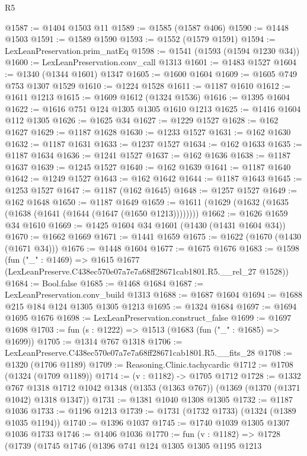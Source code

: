 \begin{lexlean}{R5}
\begin{coremodule}
@1587 := @1404 @1503 @11
@1589 := @1585 (@1587 @406)
@1590 := @1448 @1503
@1591 := @1589 @1590
@1593 := @1552 (@1579 @1591)
@1594 := LexLeanPreservation.prim_natEq
@1598 := @1541 (@1593 (@1594 @1230 @34))
@1600 := LexLeanPreservation.conv_call @1313
@1601 := @1483 @1527
@1604 := @1340 (@1344 @1601) @1347
@1605 := @1600 @1604
@1609 := @1605 @749 @753 @1307 @1529
@1610 := @1224 @1528
@1611 := @1187 @1610
@1612 := @1611 @1213
@1615 := @1609 @1612 (@1324 @1536)
@1616 := @1395 @1604
@1622 := @1616 @751 @124 @1305 @1305 @1610 @1213
@1625 := @1416 @1604 @112 @1305
@1626 := @1625 @34
@1627 := @1229 @1527
@1628 := @162 @1627
@1629 := @1187 @1628
@1630 := @1233 @1527
@1631 := @162 @1630
@1632 := @1187 @1631
@1633 := @1237 @1527
@1634 := @162 @1633
@1635 := @1187 @1634
@1636 := @1241 @1527
@1637 := @162 @1636
@1638 := @1187 @1637
@1639 := @1245 @1527
@1640 := @162 @1639
@1641 := @1187 @1640
@1642 := @1249 @1527
@1643 := @162 @1642
@1644 := @1187 @1643
@1645 := @1253 @1527
@1647 := @1187 (@162 @1645)
@1648 := @1257 @1527
@1649 := @162 @1648
@1650 := @1187 @1649
@1659 := @1611 (@1629 (@1632 (@1635 (@1638 (@1641 (@1644 (@1647 (@1650 @1213))))))))
@1662 := @1626 @1659 @34 @1610
@1669 := @1425 @1604 @34 @1601 (@1430 (@1431 @1604 @34))
@1670 := @1662 @1669
@1671 := @1441 @1659
@1675 := @1622 (@1670 (@1430 (@1671 @34)))
@1676 := @1448 @1604
@1677 := @1675 @1676
@1683 := @1598
    (fun ("_" : @1469) =>
    @1615 @1677 (LexLeanPreserve.C438ec570e07a7e7a68ff28671cab1801.R5.__rel_27 @1528))
@1684 := Bool.false
@1685 := @1468 @1684
@1687 := LexLeanPreservation.conv_build @1313
@1688 := @1687 @1604
@1694 := @1688 @215 @184 @124 @1305 @1305 @1213
@1695 := @1324 @1684
@1697 := @1694 @1695 @1676
@1698 := LexLeanPreservation.construct_false
@1699 := @1697 @1698
@1703 := fun (s : @1222) => @1513 (@1683 (fun ("_" : @1685) => @1699))
@1705 := @1314 @767 @1318
@1706 := LexLeanPreserve.C438ec570e07a7e7a68ff28671cab1801.R5.__fits_28
@1708 := @1320 (@1706 @1189)
@1709 := Reasoning.Clinic.tachycardic
@1712 := @1708 (@1324 (@1709 @1189))
@1714 := (v : @1182) -> @1705 @1712
@1728 := @1332
    @767
    @1318
    @1712
    @1042
    @1348
    (@1353 (@1363 @767))
    (@1369 (@1370 (@1371 @1042) @1318 @1347))
@1731 := @1381 @1040 @1308 @1305
@1732 := @1187 @1036
@1733 := @1196 @1213
@1739 := @1731 (@1732 @1733) (@1324 (@1389 @1035 @1194))
@1740 := @1396 @1037
@1745 := @1740 @1039 @1305 @1307 @1036 @1733
@1746 := @1406 @1036
@1770 := fun (v : @1182) =>
  @1728
    (@1739
      (@1745
        @1746
        (@1396
          @741
          @124
          @1305
          @1305
          @1195
          @1213

\end{coremodule}
\end{lexlean}
